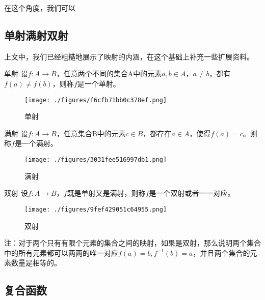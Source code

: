 在这个角度，我们可以


\subsection{单射满射双射}

上文中，我们已经粗糙地展示了映射的内涵，在这个基础上补充一些扩展资料。

\begin{definition}{单射}
设$f:A\to{B}$，任意两个不同的集合A中的元素$a,b\in{A}$，$a\not={b}$，都有$f(a)\not={f(b)}$，则称$f$是一个单射。
\end{definition}

\begin{figure}[ht]
\centering
\texttt{[image: ./figures/f6cfb71bb0c378ef.png]}
\caption{单射}\label{fig_functi_2}
\end{figure}

\begin{definition}{满射}
设$f:A\to{B}$，任意集合B中的元素$c\in{B}$，都存在$a\in{A}$，使得$f(a)=c$。则称$f$是一个满射。
\end{definition}

\begin{figure}[ht]
\centering
\texttt{[image: ./figures/3031fee516997db1.png]}
\caption{满射} \label{fig_functi_3}
\end{figure}


\begin{definition}{双射}
设$f:A\to{B}$，$f$既是单射又是满射，则称$f$是一个双射或者一一对应。
\end{definition}

\begin{figure}[ht]
\centering
\texttt{[image: ./figures/9fef429051c64955.png]}
\caption{双射} \label{fig_functi_4}
\end{figure}

注：对于两个只有有限个元素的集合之间的映射，如果是双射，那么说明两个集合中的所有元素都可以两两的唯一对应$f(a)=b,f^{-1}(b)=a$，并且两个集合的元素数量是相等的。


\subsection{复合函数}



